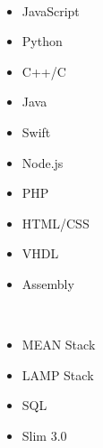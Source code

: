 

\\
\begin{multicols}{2}
    \begin{itemize}
      \item JavaScript
      \item Python
      \item C++/C
      \item Java
      \item Swift
      \item Node.js
      \item PHP
      \item HTML/CSS
      \item VHDL
      \item Assembly
    \end{itemize}
\end{multicols}
\divider

\\
\begin{multicols}{2}
    \begin{itemize}
    	\item MEAN Stack
    	\item LAMP Stack
      	\item SQL
        \item Slim 3.0
    \end{itemize}
\end{multicols}
\divider

